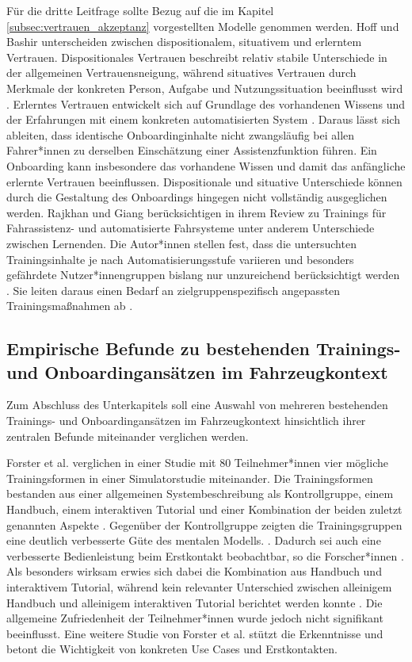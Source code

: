 Für die dritte Leitfrage sollte Bezug auf die im Kapitel \ref{subsec:vertrauen_akzeptanz} vorgestellten Modelle genommen werden. Hoff und Bashir \cite{hoff2015trust} unterscheiden zwischen dispositionalem, situativem und erlerntem Vertrauen. Dispositionales Vertrauen beschreibt relativ stabile
Unterschiede in der allgemeinen Vertrauensneigung, während situatives
Vertrauen durch Merkmale der konkreten Person, Aufgabe und Nutzungssituation beeinflusst wird \cite{hoff2015trust}. Erlerntes Vertrauen entwickelt sich auf Grundlage des vorhandenen Wissens und der Erfahrungen mit einem konkreten automatisierten System \cite{hoff2015trust}. Daraus lässt sich ableiten, dass identische Onboardinginhalte nicht zwangsläufig bei allen Fahrer*innen zu derselben Einschätzung einer Assistenzfunktion führen. Ein Onboarding kann insbesondere das vorhandene Wissen und damit das anfängliche erlernte Vertrauen
beeinflussen. Dispositionale und situative Unterschiede können durch die Gestaltung des Onboardings hingegen nicht vollständig ausgeglichen werden. Rajkhan und Giang \cite{rajkhan2025automated} berücksichtigen in ihrem Review zu Trainings für Fahrassistenz- und automatisierte Fahrsysteme unter anderem Unterschiede zwischen Lernenden. Die Autor*innen stellen fest, dass die untersuchten Trainingsinhalte je nach Automatisierungsstufe variieren und besonders gefährdete Nutzer*innengruppen bislang nur unzureichend berücksichtigt werden \cite{rajkhan2025automated}. Sie leiten daraus einen Bedarf an zielgruppenspezifisch angepassten Trainingsmaßnahmen ab \cite{rajkhan2025automated}.


\subsection{Empirische Befunde zu bestehenden Trainings- und
Onboardingansätzen im Fahrzeugkontext}
\label{subsec:onboarding_wirksamkeit}
Zum Abschluss des Unterkapitels soll eine Auswahl von mehreren bestehenden Trainings- und Onboardingansätzen im Fahrzeugkontext hinsichtlich ihrer zentralen Befunde miteinander verglichen werden. 

Forster et al. \cite{forster2020and} verglichen in einer Studie mit 80 Teilnehmer*innen vier mögliche Trainingsformen in einer Simulatorstudie miteinander. Die Trainingsformen bestanden aus einer allgemeinen Systembeschreibung als Kontrollgruppe, einem Handbuch, einem interaktiven Tutorial und einer Kombination der beiden zuletzt genannten Aspekte \cite{forster2020and}. Gegenüber der Kontrollgruppe zeigten die Trainingsgruppen eine deutlich verbesserte Güte des mentalen Modells. \cite{forster2020and}. Dadurch sei auch eine verbesserte Bedienleistung beim Erstkontakt beobachtbar, so die Forscher*innen \cite{forster2020and}. Als besonders wirksam erwies sich dabei die Kombination aus Handbuch und interaktivem Tutorial, während kein relevanter Unterschied zwischen alleinigem Handbuch und alleinigem interaktiven Tutorial berichtet werden konnte  \cite{forster2020and}. Die allgemeine Zufriedenheit der Teilnehmer*innen wurde jedoch nicht signifikant beeinflusst. Eine weitere Studie von Forster et al. \cite{forster2019user} stützt die Erkenntnisse und betont die Wichtigkeit von konkreten Use Cases und Erstkontakten.

